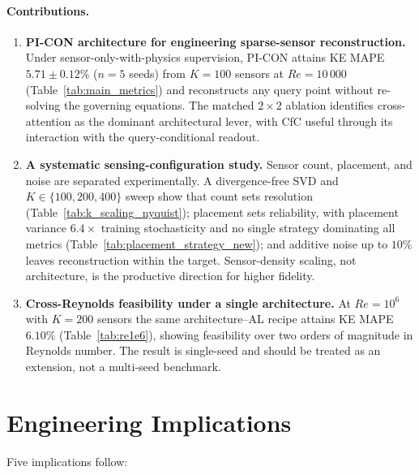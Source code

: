 \paragraph{Contributions.}
\begin{enumerate}
    \item \textbf{PI-CON architecture for engineering sparse-sensor reconstruction.} Under sensor-only-with-physics supervision, PI-CON attains KE MAPE $5.71 \pm 0.12\%$ ($n=5$ seeds) from $K=100$ sensors at $Re=10\,000$ (Table~\ref{tab:main_metrics}) and reconstructs any query point without re-solving the governing equations. The matched $2\times2$ ablation identifies cross-attention as the dominant architectural lever, with CfC useful through its interaction with the query-conditional readout.
    \item \textbf{A systematic sensing-configuration study.} Sensor count, placement, and noise are separated experimentally. A divergence-free SVD and $K\in\{100,200,400\}$ sweep show that count sets resolution (Table~\ref{tab:k_scaling_nyquist}); placement sets reliability, with placement variance $6.4\times$ training stochasticity and no single strategy dominating all metrics (Table~\ref{tab:placement_strategy_new}); and additive noise up to $10\%$ leaves reconstruction within the target. Sensor-density scaling, not architecture, is the productive direction for higher fidelity.
    \item \textbf{Cross-Reynolds feasibility under a single architecture.} At $Re=10^6$ with $K=200$ sensors the same architecture--AL recipe attains KE MAPE $6.10\%$ (Table~\ref{tab:re1e6}), showing feasibility over two orders of magnitude in Reynolds number. The result is single-seed and should be treated as an extension, not a multi-seed benchmark.
\end{enumerate}

\section{Engineering Implications}
\label{sec:engineering_impl}

Five implications follow:

